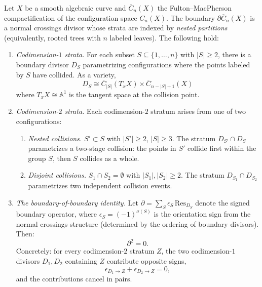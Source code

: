 \begin{theorem}
\label{thm:config-boundary-relations}
Let $X$ be a smooth algebraic curve and
$\overline{C}_n(X)$ the Fulton--MacPherson compactification of the
configuration space $C_n(X)$.  The boundary $\partial\overline{C}_n(X)$ is a
normal crossings divisor whose strata are indexed by \emph{nested partitions}
(equivalently, rooted trees with $n$ labeled leaves).  The following hold:

\begin{enumerate}[label=(\roman*)]
\item \emph{Codimension-$1$ strata.}  For each subset
  $S \subseteq \{1, \ldots, n\}$ with $|S| \geq 2$, there is a boundary
  divisor $D_S$ parametrizing configurations where the points labeled by
  $S$ have collided.  As a variety,
  \[
    D_S \cong \overline{C}_{|S|}(T_{x}X) \times \overline{C}_{n - |S| + 1}(X)
  \]
  where $T_x X \cong \mathbb{A}^1$ is the tangent space at the collision point.

\item \emph{Codimension-$2$ strata.}  Each codimension-$2$ stratum arises
  from one of two configurations:
  \begin{enumerate}[label=(\alph*)]
  \item \emph{Nested collisions.} $S' \subset S$ with $|S'| \geq 2$,
    $|S| \geq 3$.  The stratum $D_{S'} \cap D_S$ parametrizes a two-stage
    collision: the points in $S'$ collide first within the group $S$, then $S$
    collides as a whole.
  \item \emph{Disjoint collisions.} $S_1 \cap S_2 = \emptyset$ with
    $|S_1|, |S_2| \geq 2$.  The stratum $D_{S_1} \cap D_{S_2}$ parametrizes
    two independent collision events.
  \end{enumerate}

\item \emph{The boundary-of-boundary identity.}
  Let $\partial = \sum_{S} \epsilon_S\, \mathrm{Res}_{D_S}$ denote the signed
  boundary operator, where $\epsilon_S = (-1)^{\sigma(S)}$ is the orientation
  sign from the normal crossings structure (determined by the ordering of
  boundary divisors). Then:
  \begin{equation}\label{eq:boundary-squared-zero}
    \partial^2 = 0.
  \end{equation}
  Concretely: for every codimension-$2$ stratum $Z$, the two codimension-$1$
  divisors $D_1, D_2$ containing $Z$ contribute opposite signs,
  \[
    \epsilon_{D_1 \to Z} + \epsilon_{D_2 \to Z} = 0,
  \]
  and the contributions cancel in pairs.
\end{enumerate}
\end{theorem}

